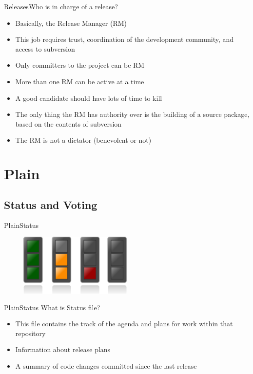 \documentclass[10pt]{beamer}
\begin{document}
\begin{frame}{Releases}{Who is in charge of a release?}
  \begin{itemize}
    \item Basically, the Release Manager (RM) \pause
    \item This job requires trust, coordination of the development community,
          and access to subversion \pause
    \item Only committers to the project can be RM \pause
    \item More than one RM can be active at a time \pause
    \item A good candidate should have lots of time to kill \pause
    \item The only thing the RM has authority over is the building of a
          source package, based on the contents of subversion \pause
    \item The RM is not a dictator (benevolent or not)
  \end{itemize}
\end{frame}

\section{Plain}

\subsection{Status and Voting}

\begin{frame}{Plain}{Status}
  \begin{figure}[ht]
    \centering
    \includegraphics[width=0.5\textwidth, keepaspectratio=true]{images/status.png}
  \end{figure}
\end{frame}

\begin{frame}{Plain}{Status}
  What is Status file? \pause
  \begin{itemize}
    \item This file contains the track of the agenda and plans for work within
          that repository \pause
    \item Information about release plans \pause
    \item A summary of code changes committed since the last release
  \end{itemize}
\end{frame}
\end{document}
